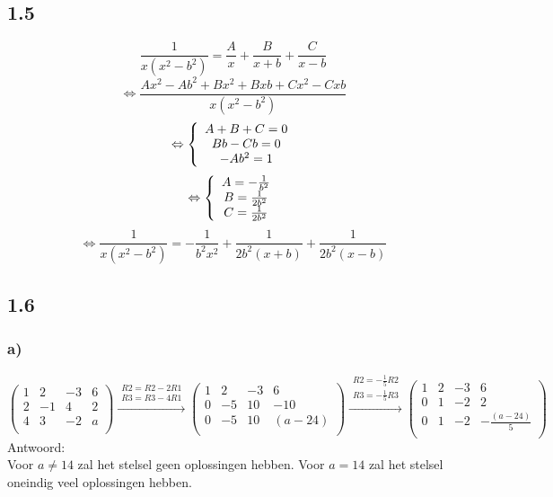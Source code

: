 \documentclass[11pt]{article}
\begin{document}
\subsection*{1.5}
\[
\frac{1}{x(x^2-b^2)} = \frac{A}{x} + \frac{B}{x+b} + \frac{C}{x-b}
\]
\[
\Leftrightarrow
\frac{Ax^2-Ab^2+Bx^2+Bxb+Cx^2-Cxb}{x(x^2-b^2)}
\]
\[
\Leftrightarrow
\left\lbrace
\begin{array}{c c}
A+B+C=0\\
Bb-Cb=0\\
-Ab^2=1
\end{array}
\right.
\]
\[
\Leftrightarrow
\left\lbrace
\begin{array}{c c}
A = -\frac{1}{b^2}\\
B = \frac{1}{2b^2}\\
C = \frac{1}{2b^2}
\end{array}
\right.
\]
\[
\Leftrightarrow
\frac{1}{x(x^2-b^2)} = -\frac{1}{b^2x^2} + \frac{1}{2b^2(x+b)} + \frac{1}{2b^2(x-b)}
\]

\subsection*{1.6}
\subsubsection*{a)}
\[
\begin{pmatrix}
  1 & 2 & -3 & 6 \\
  2 & -1 & 4 & 2 \\
  4 & 3 & -2 & a \\
 \end{pmatrix}
  \overset{\begin{matrix}
  R2 = R2 - 2R1 \\
  R3 = R3 - 4R1
 \end{matrix}}{\rightarrow}
\begin{pmatrix}
  1 & 2 & -3 & 6 \\
  0 & -5 & 10 & -10 \\
  0 & -5 & 10 & (a-24) \\
 \end{pmatrix}
 \overset{\begin{matrix}
  R2 = -\frac{1}{5}R2 \\
  R3 = -\frac{1}{5}R3
 \end{matrix}}{\rightarrow}
 \begin{pmatrix}
  1 & 2 & -3 & 6 \\
  0 & 1 & -2 & 2 \\
  0 & 1 & -2 & -\frac{(a-24)}{5} \\
 \end{pmatrix}
\]
Antwoord:\\
Voor $a\neq14$ zal het stelsel geen oplossingen hebben.
Voor $a=14$ zal het stelsel oneindig veel oplossingen hebben.
\end{document}
